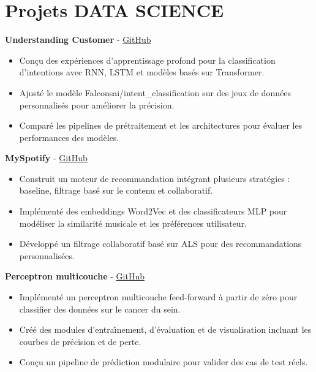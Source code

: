 \documentclass[a4paper,11pt]{article}%
\begin{document}
\section*{Projets DATA SCIENCE}%
%
\noindent \textbf{Understanding Customer} - \href{https://github.com/sboof911/Understanding-customer}{GitHub}%
\begin{itemize}[leftmargin=2em,label={},parsep=0pt,topsep=1em]%
\item Con\c{c}u des exp\'eriences d'apprentissage profond pour la classification d'intentions avec RNN, LSTM et mod\`eles bas\'es sur Transformer.%
\item Ajust\'e le mod\`ele Falconsai/intent\_classification sur des jeux de donn\'ees personnalis\'es pour am\'eliorer la pr\'ecision.%
\item Compar\'e les pipelines de pr\'etraitement et les architectures pour \'evaluer les performances des mod\`eles.%
\end{itemize}%
%
\noindent \textbf{MySpotify} - \href{https://github.com/sboof911/MySpotify}{GitHub}%
\begin{itemize}[leftmargin=2em,label={},parsep=0pt,topsep=1em]%
\item Construit un moteur de recommandation int\'egrant plusieurs strat\'egies : baseline, filtrage bas\'e sur le contenu et collaboratif.%
\item Impl\'ement\'e des embeddings Word2Vec et des classificateurs MLP pour mod\'eliser la similarit\'e musicale et les pr\'ef\'erences utilisateur.%
\item D\'evelopp\'e un filtrage collaboratif bas\'e sur ALS pour des recommandations personnalis\'ees.%
\end{itemize}%
%
\noindent \textbf{Perceptron multicouche} - \href{https://github.com/sboof911/Multilayer-Perceptron}{GitHub}%
\begin{itemize}[leftmargin=2em,label={},parsep=0pt,topsep=1em]%
\item Impl\'ement\'e un perceptron multicouche feed-forward \`a partir de z\'ero pour classifier des donn\'ees sur le cancer du sein.%
\item Cr\'e\'e des modules d'entra{\^\i}nement, d'\'evaluation et de visualisation incluant les courbes de pr\'ecision et de perte.%
\item Con\c{c}u un pipeline de pr\'ediction modulaire pour valider des cas de test r\'eels.%
\end{itemize}%
%
\end{document}
